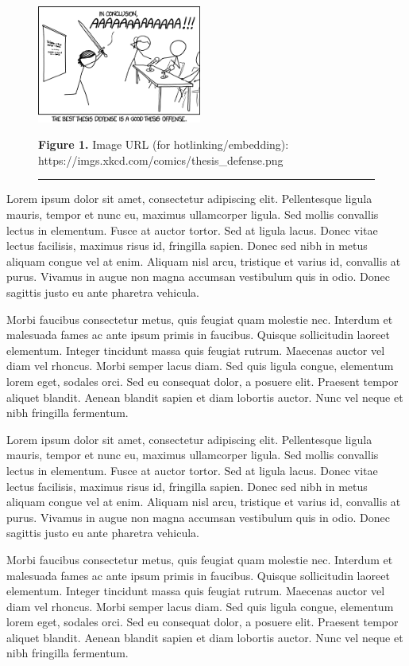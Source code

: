 \begin{multicols}{2}
\begin{figure}[H]
\begin{center}
\includegraphics[width=0.48\textwidth] 
{chapters/chapter-template/fig-template/thesisdefense.png}
 \end{center}
 \textbf{Figure 1.} \small{Image URL (for hotlinking/embedding): 
https://imgs.xkcd.com/comics/thesis\_defense.png}
\rule{0.49\textwidth}{1.0pt}
\end{figure}

 Lorem ipsum dolor sit amet, consectetur adipiscing elit. Pellentesque ligula 
mauris, tempor et nunc eu, maximus ullamcorper ligula. Sed mollis convallis 
lectus in elementum. Fusce at auctor tortor. Sed at ligula lacus. Donec vitae 
lectus facilisis, maximus risus id, fringilla sapien. Donec sed nibh in metus 
aliquam congue vel at enim. Aliquam nisl arcu, tristique et varius id, convallis 
at purus. Vivamus in augue non magna accumsan vestibulum quis in odio. Donec 
sagittis justo eu ante pharetra vehicula.

Morbi faucibus consectetur metus, quis feugiat quam molestie nec. Interdum et 
malesuada fames ac ante ipsum primis in faucibus. Quisque sollicitudin laoreet 
elementum. Integer tincidunt massa quis feugiat rutrum. Maecenas auctor vel diam 
vel rhoncus. Morbi semper lacus diam. Sed quis ligula congue, elementum lorem 
eget, sodales orci. Sed eu consequat dolor, a posuere elit. Praesent tempor 
aliquet blandit. Aenean blandit sapien et diam lobortis auctor. Nunc vel neque 
et nibh fringilla fermentum. 

 Lorem ipsum dolor sit amet, consectetur adipiscing elit. Pellentesque ligula 
mauris, tempor et nunc eu, maximus ullamcorper ligula. Sed mollis convallis 
lectus in elementum. Fusce at auctor tortor. Sed at ligula lacus. Donec vitae 
lectus facilisis, maximus risus id, fringilla sapien. Donec sed nibh in metus 
aliquam congue vel at enim. Aliquam nisl arcu, tristique et varius id, convallis 
at purus. Vivamus in augue non magna accumsan vestibulum quis in odio. Donec 
sagittis justo eu ante pharetra vehicula.

Morbi faucibus consectetur metus, quis feugiat quam molestie nec. Interdum et 
malesuada fames ac ante ipsum primis in faucibus. Quisque sollicitudin laoreet 
elementum. Integer tincidunt massa quis feugiat rutrum. Maecenas auctor vel diam 
vel rhoncus. Morbi semper lacus diam. Sed quis ligula congue, elementum lorem 
eget, sodales orci. Sed eu consequat dolor, a posuere elit. Praesent tempor 
aliquet blandit. Aenean blandit sapien et diam lobortis auctor. Nunc vel neque 
et nibh fringilla fermentum. 


\end{multicols}
